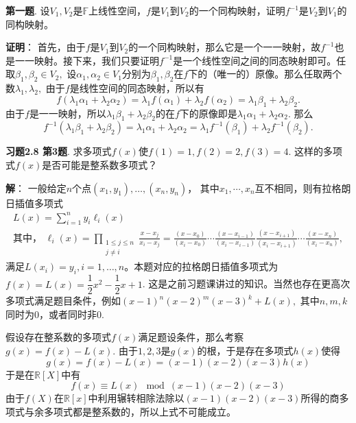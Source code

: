 \newpageorvspace


{\bf 第一题}. 设$V_1, V_2$是$\mathbb{F}$上线性空间，$f$是$V_1$到$V_2$的一个同构映射，证明$f^{-1}$是$V_2$到$V_1$的同构映射。

\ifIncludeAnswer

\newpageorvspace

{\bf 证明}： 首先，由于$f$是$V_1$到$V_2$的一个同构映射，那么它是一个一一映射，故$f^{-1}$也是一一映射。接下来，我们只要证明$f^{-1}$是一个线性空间之间的同态映射即可。任取$\beta_1, \beta_2 \in V_2,$ 设$\alpha_1, \alpha_2 \in V_1$分别为$\beta_1, \beta_2$在$f$下的（唯一的）原像。那么任取两个数$\lambda_1, \lambda_2,$ 由于$f$是线性空间的同态映射，所以有
$$f(\lambda_1 \alpha_1 + \lambda_2 \alpha_2) = \lambda_1 f(\alpha_1) + \lambda_2 f(\alpha_2) = \lambda_1 \beta_1 + \lambda_2 \beta_2.$$
由于$f$是一一映射，所以$\lambda_1 \beta_1 + \lambda_2 \beta_2$的在$f$下的原像即是$\lambda_1 \alpha_1 + \lambda_2 \alpha_2.$ 那么
$$f^{-1}(\lambda_1 \beta_1 + \lambda_2 \beta_2) = \lambda_1 \alpha_1 + \lambda_2 \alpha_2 = \lambda_1 f^{-1}(\beta_1) + \lambda_2 f^{-1}(\beta_2).$$

\fi  %

\newpageorvspace

{\bf 习题2.8 第3题}. 求多项式$f(x)$使$f(1) = 1, f(2) = 2, f(3) = 4.$ 这样的多项式$f(x)$是否可能是整系数多项式？

\ifIncludeAnswer

\newpageorvspace

{\bf 解}： 一般给定$n$个点$(x_1,y_1), \dots, (x_n,y_n)$， 其中$x_1, \cdots, x_n$互不相同，则有拉格朗日插值多项式
\begin{gather*}
L(x) = \sum_{i=1}^{n}y_{i}\ell_{i}(x) \\
\text{其中， } \ell_{i}(x) = \prod_{\begin{smallmatrix}1\leq j \leq n \\ j\neq i\end{smallmatrix}}{\frac {x-x_{j}}{x_{i}-x_{j}}}={\frac {(x-x_{0})}{(x_{i}-x_{0})}}\cdots {\frac {(x-x_{i-1})}{(x_{i}-x_{i-1})}}{\frac {(x-x_{i+1})}{(x_{i}-x_{i+1})}}\cdots {\frac {(x-x_{n})}{(x_{i}-x_{n})}},
\end{gather*}
满足$L(x_i) = y_i, i=1, \dots ,n$。本题对应的拉格朗日插值多项式为$f(x) = L(x) = \dfrac{1}{2}x^2 - \dfrac{1}{2}x + 1$. 这是之前习题课讲过的知识。当然也存在更高次多项式满足题目条件，例如$(x-1)^n(x-2)^m(x-3)^k + L(x),$ 其中$n, m, k$同时为0，或者同时非0.

假设存在整系数的多项式$f(x)$满足题设条件，那么考察$g(x) = f(x) - L(x).$ 由于$1, 2, 3$是$g(x)$的根，于是存在多项式$h(x)$使得
$$g(x) = f(x) - L(x) = (x-1)(x-2)(x-3) h(x)$$
于是在$\mathbb{R}[X]$中有
$$f(x) \equiv L(x) \mod (x-1)(x-2)(x-3)$$
由于$f(X)$在$\mathbb{R}[x]$中利用辗转相除法除以$(x-1)(x-2)(x-3)$所得的商多项式与余多项式都是整系数的，所以上式不可能成立。

